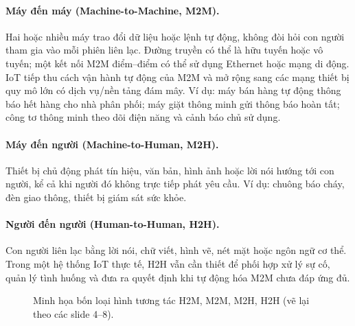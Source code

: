 \paragraph{Máy đến máy (Machine-to-Machine, M2M).} Hai hoặc nhiều máy trao đổi dữ liệu hoặc lệnh tự động, không đòi hỏi con người tham gia vào mỗi phiên liên lạc. Đường truyền có thể là hữu tuyến hoặc vô tuyến; một kết nối M2M điểm--điểm có thể sử dụng Ethernet hoặc mạng di động. IoT tiếp thu cách vận hành tự động của M2M và mở rộng sang các mạng thiết bị quy mô lớn có dịch vụ/nền tảng đám mây. Ví dụ: máy bán hàng tự động thông báo hết hàng cho nhà phân phối; máy giặt thông minh gửi thông báo hoàn tất; công tơ thông minh theo dõi điện năng và cảnh báo chủ sử dụng. 

\paragraph{Máy đến người (Machine-to-Human, M2H).} Thiết bị chủ động phát tín hiệu, văn bản, hình ảnh hoặc lời nói hướng tới con người, kể cả khi người đó không trực tiếp phát yêu cầu. Ví dụ: chuông báo cháy, đèn giao thông, thiết bị giám sát sức khỏe. 

\paragraph{Người đến người (Human-to-Human, H2H).} Con người liên lạc bằng lời nói, chữ viết, hình vẽ, nét mặt hoặc ngôn ngữ cơ thể. Trong một hệ thống IoT thực tế, H2H vẫn cần thiết để phối hợp xử lý sự cố, quản lý tình huống và đưa ra quyết định khi tự động hóa M2M chưa đáp ứng đủ. 

\begin{figure}[htbp]\centering
{}
\caption{Minh họa bốn loại hình tương tác H2M, M2M, M2H, H2H (vẽ lại theo các slide 4--8).}\end{figure}

